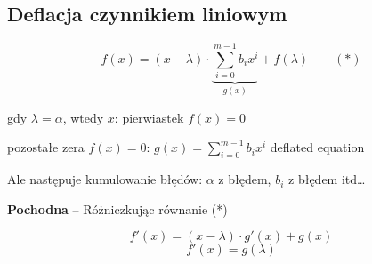 \subsection{Deflacja czynnikiem liniowym}

\begin{frame}
  $$ f(x) = (x - \lambda) \cdot \underbrace{\sum_{i=0}^{m-1} b_i x^i}_{g(x)} + f(\lambda) \qquad (*) $$

  gdy $ \lambda = \alpha $, wtedy $x$: pierwiastek $ f(x) = 0 $

  \vspace{5px}

  pozostałe zera $f(x) = 0$: $ g(x) = \sum_{i=0}^{m-1} b_i x^i $ \qquad deflated equation

  \vspace{5px}

  Ale następuje kumulowanie błędów: $\alpha$ z błędem, $b_i$ z błędem itd\dots
\end{frame}

\begin{frame}
  \textbf{Pochodna} -- Różniczkując równanie (*)

  $$ f'(x) = (x - \lambda) \cdot g'(x) + g(x) $$
  $$ f'(x) = g(\lambda) $$
\end{frame}
